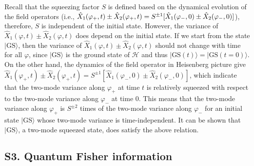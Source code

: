 \documentclass[twocolumn,prl,floatfix,citeautoscript,nofootinbib,superscriptaddress]{revtex4}
\begin{document}
\begin{widetext}
Recall that the squeezing factor $S$ is defined based on the dynamical
evolution of the field operators (i.e., $\hat{X}_{1}(\varphi _{+},t)\pm \hat{%
X}_{2}(\varphi _{+},t)=S^{\pm 1}[\hat{X}_{1}(\varphi _{-},0)\pm \hat{X}%
_{2}(\varphi _{-},0)]$), therefore, $S$ is independent of the initial state.
However, the variance of $\hat{X}_{1}(\varphi ,t)\pm \hat{X}_{2}(\varphi ,t)$
does depend on the initial state. If we start from the state $|\text{GS}%
\rangle $, then the variance of $\hat{X}_{1}(\varphi ,t)\pm \hat{X}%
_{2}(\varphi ,t)$ should not change with time for all $\varphi $, since $|%
\text{GS}\rangle $ is the ground state of $\mathcal{H}$ and thus $|\text{GS}%
(t)\rangle =|\text{GS}(t=0)\rangle $. On the other hand, the dynamics of the
field operator in Heisenberg picture give $\hat{X}_{1}(\varphi _{+},t)\pm
\hat{X}_{2}(\varphi _{+},t)=S^{\pm 1}[\hat{X}_{1}(\varphi _{-},0)\pm \hat{X}%
_{2}(\varphi _{-},0)]$, which indicate that the two-mode variance along $%
\varphi _{+}$ at time $t$ is relatively squeezed with respect to the
two-mode variance along $\varphi _{-}$ at time $0$. This means that the
two-mode variance along $\varphi _{+}$ is $S^{\pm 2}$ times of the two-mode
variance along $\varphi _{-}$ for an initial state $|\text{GS}\rangle $
whose two-mode variance is time-independent. It can be shown that $|\text{GS}%
\rangle $, a two-mode squeezed state, does satisfy the above relation.

\subsection{S3. Quantum Fisher information}


\end{widetext}
\end{document}
